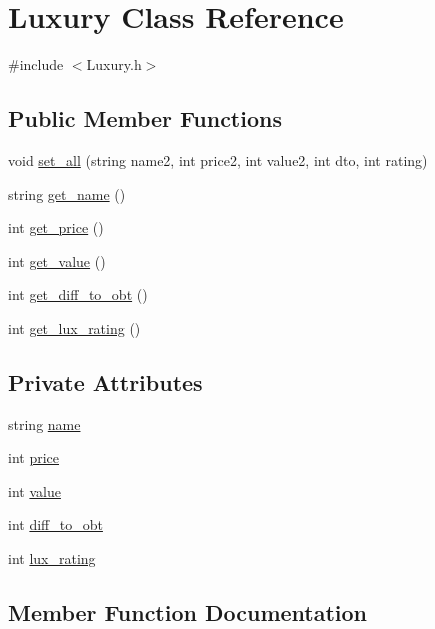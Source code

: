 \hypertarget{classLuxury}{}\section{Luxury Class Reference}
\label{classLuxury}


{\ttfamily \#include $<$Luxury.\+h$>$}

\subsection*{Public Member Functions}
\begin{DoxyCompactItemize}
\item 
void \hyperlink{classLuxury_ab918c5b7fb4fe5a9283f836673b99155}{set\+\_\+all} (string name2, int price2, int value2, int dto, int rating)
\item 
string \hyperlink{classLuxury_a53c657a65d8cbacf6ad92d1c3a34778b}{get\+\_\+name} ()
\item 
int \hyperlink{classLuxury_ad791614afa7a51a373b2eed1c99ab8c2}{get\+\_\+price} ()
\item 
int \hyperlink{classLuxury_a848d938b5e7ec2499fa623655a683123}{get\+\_\+value} ()
\item 
int \hyperlink{classLuxury_ad374478b27b1764354826ac0f61f88cc}{get\+\_\+diff\+\_\+to\+\_\+obt} ()
\item 
int \hyperlink{classLuxury_af2270c6407954955ac7f1ac71d98e3a6}{get\+\_\+lux\+\_\+rating} ()
\end{DoxyCompactItemize}
\subsection*{Private Attributes}
\begin{DoxyCompactItemize}
\item 
string \hyperlink{classLuxury_af278b0f28797065ce17a277c6bb5b806}{name}
\item 
int \hyperlink{classLuxury_a4fddd3e1aa113496609a7ba24552763b}{price}
\item 
int \hyperlink{classLuxury_aa1ba63c4ce936dc65c41bfdca5af9c73}{value}
\item 
int \hyperlink{classLuxury_a4b82065f387c9625a25a632729786575}{diff\+\_\+to\+\_\+obt}
\item 
int \hyperlink{classLuxury_abb3437dfb182bbeee6f3a54fec579922}{lux\+\_\+rating}
\end{DoxyCompactItemize}


\subsection{Member Function Documentation}
\mbox{\label{classLuxury_ad374478b27b1764354826ac0f61f88cc}} 
